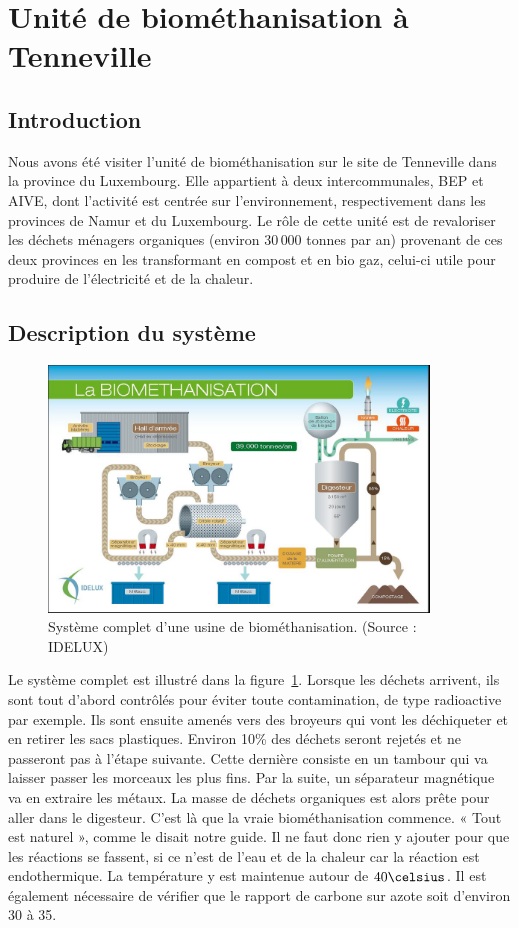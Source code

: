 \section{Unité de biométhanisation à Tenneville}

\subsection{Introduction}
Nous avons été visiter l'unité de biométhanisation sur le site de Tenneville dans la
province du Luxembourg. Elle appartient à deux intercommunales, BEP et AIVE, dont
l'activité est centrée sur l'environnement, respectivement dans les provinces de Namur
et du Luxembourg. Le rôle de cette unité est de revaloriser les déchets ménagers
organiques (environ $30\,000$ tonnes par an) provenant de ces deux provinces en les
transformant en compost et en bio gaz, celui-ci utile pour produire de l'électricité et de la
chaleur.

\subsection{Description du système}

\begin{figure}
\centering
\includegraphics[width=0.9\textwidth]{img/biometh1}
\caption{Système complet d'une usine de biométhanisation. (Source : IDELUX)}
\label{fig:biometh1}
\end{figure}

Le système complet est illustré dans la figure~\ref{fig:biometh1}.
Lorsque les déchets arrivent, ils sont tout d'abord contrôlés pour éviter toute contamination, de type radioactive par exemple. Ils sont ensuite amenés vers des broyeurs qui vont les déchiqueter et en retirer les sacs plastiques. Environ 10\% des déchets seront rejetés et ne passeront pas à l'étape suivante. Cette dernière consiste en un tambour qui va laisser passer les morceaux les plus fins. Par la suite, un séparateur magnétique va en extraire les métaux. La masse de déchets organiques est alors prête pour aller dans le digesteur. C'est là que la vraie biométhanisation commence. « Tout est naturel », comme le disait notre guide. Il ne faut donc rien y ajouter pour que les réactions se fassent, si ce n'est de l'eau et de la chaleur car la réaction est endothermique. La température y est maintenue autour de $40\celsius$. Il est également nécessaire de vérifier que le rapport de carbone sur azote soit d'environ 30 à 35.

